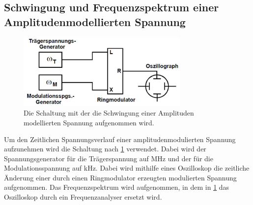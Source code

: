 \subsection{Schwingung und Frequenzspektrum einer Amplitudenmodellierten Spannung}
\begin{figure}[h!]
	\centering
	\includegraphics[width = 0.75\textwidth]{../Grafiken/Versuchsaufbau_a.pdf}
	\caption{Die Schaltung mit der die Schwingung einer Amplituden modellierten Spannung aufgenommen wird.\cite{V59}\label{fig:Aufbau_a}}
\end{figure}
Um den Zeitlichen Spannungsverlauf einer amplitudenmodulierten Spannung aufzunehmen wird die Schaltung nach \cref{fig:Aufbau_a} verwendet.
Dabei wird der Spannungsgenerator für die Trägerspannung auf MHz und der für die Modulationsspannung auf kHz.
Dabei wird mithilfe eines Oszilloskop die zeitliche Änderung einer durch einen Ringmodulator erzeugten modulierten Spannung aufgenommen.
Das Frequenzspektrum wird aufgenommen, in dem in \cref{fig:Aufbau_a} das Oszilloskop durch ein Frequenzanalyser ersetzt wird.

\newpage
